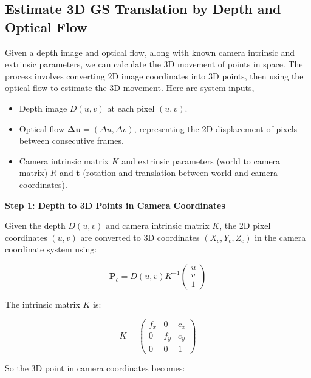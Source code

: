\subsection{Estimate 3D GS Translation by Depth and Optical Flow}
Given a depth image and optical flow, along with known camera intrinsic and extrinsic parameters, we can calculate the 3D movement of points in space. The process involves converting 2D image coordinates into 3D points, then using the optical flow to estimate the 3D movement. Here are system inputs,
\begin{itemize}
	\item Depth image \( D(u, v) \) at each pixel \((u, v)\).
	\item Optical flow \( \mathbf{\Delta u} = (\Delta u, \Delta v) \), representing the 2D displacement of pixels between consecutive frames.
	\item Camera intrinsic matrix \( K \) and extrinsic parameters (world to camera matrix) \( R \) and \( \mathbf{t} \) (rotation and translation between world and camera coordinates).
\end{itemize}

\textbf{Step 1: Depth to 3D Points in Camera Coordinates}

Given the depth \( D(u, v) \) and camera intrinsic matrix \( K \), the 2D pixel coordinates \((u, v)\) are converted to 3D coordinates \((X_c, Y_c, Z_c)\) in the camera coordinate system using:

\[
\mathbf{P}_c = D(u, v) K^{-1} \begin{pmatrix} u \\ v \\ 1 \end{pmatrix}
\]

The intrinsic matrix \( K \) is:

\[
K = \begin{pmatrix}
	f_x & 0 & c_x \\
	0 & f_y & c_y \\
	0 & 0 & 1
\end{pmatrix}
\]

So the 3D point in camera coordinates becomes:

